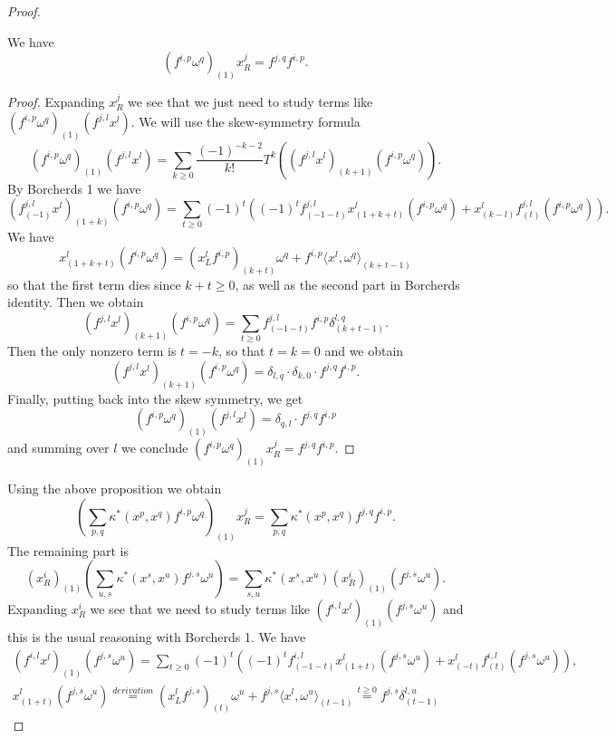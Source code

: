 \documentclass[a4paper, 10pt]{article}
\begin{document}
\begin{proof}
                \begin{prop}
                    We have \[(f^{i,p}\omega^q)_{(1)}x^j_R = f^{j,q}f^{i,p}. \]
                \end{prop}
                \begin{proof}
                    Expanding $x^j_R$ we see that we just need to study terms like $(f^{i,p}\omega^q)_{(1)}(f^{j,l}x^l)$.  We will use the skew-symmetry formula \[(f^{i,p}\omega^q)_{(1)}(f^{j, l}x^l) = \sum_{k \geq 0} \frac{(-1)^{-k-2}}{k!}T^k\left((f^{j,l}x^l)_{(k+1)}(f^{i,p}\omega^q)\right). \]
                    By Borcherds 1 we have \[(f^{j,l}_{(-1)}x^l)_{(1+k)}(f^{i,p}\omega^q) = \sum_{t \geq 0} (-1)^t\left((-1)^tf^{j,l}_{(-1-t)}x^l_{(1+k+t)}(f^{i,p}\omega^q) + x^l_{(k-l)}f^{j,l}_{(t)}(f^{i,p}\omega^q) \right). \] We have \[x^l_{(1+k+t)}(f^{i,p}\omega^q) = (x^l_Lf^{i,p})_{(k+t)}\omega^q + f^{i,p}\langle x^l, \omega^q \rangle_{(k+t-1)} \] so that the first term dies since $k+t \geq 0$, as well as the second part in Borcherds identity. Then we obtain \[(f^{j, l}x^l)_{(k+1)}(f^{i,p}\omega^q) = \sum_{t \geq 0} f^{j, l}_{(-1-t)}f^{i,p}\delta^{l,q}_{(k+t-1)}. \] Then the only nonzero term is $t = -k$, so that $t = k = 0$ and we obtain \[(f^{j, l}x^l)_{(k+1)}(f^{i,p}\omega^q) = \delta_{l, q}\cdot \delta_{k, 0} \cdot f^{j,q}f^{i,p}. \] Finally, putting back into the skew symmetry, we get \[(f^{i,p}\omega^q)_{(1)}(f^{j,l}x^l) = \delta_{q, l} \cdot f^{j,q}f^{i,p} \] and summing over $l$ we conclude $(f^{i,p}\omega^q)_{(1)}x^j_R = f^{j,q}f^{i,p}$.
                \end{proof}
                Using the above proposition we obtain \[\left(\sum_{p,q} \kappa^*(x^p,x^q)f^{i,p}\omega^q\right)_{(1)}x^j_R = \sum_{p,q}\kappa^*(x^p, x^q)f^{j,q}f^{i,p}. \]
                The remaining part is \[(x^i_R)_{(1)}\left(\sum_{u, s} \kappa^*(x^s, x^u)f^{j,s}\omega^u \right) = \sum_{s,u} \kappa^*(x^s, x^u)(x^i_R)_{(1)}(f^{j,s}\omega^u). \] Expanding $x^i_R$ we see that we need to study terms like $(f^{i, l}x^l)_{(1)}(f^{j,s}\omega^u)$ and this is the usual reasoning with Borcherds 1. We have 
                \begin{gather*}
                    (f^{i,l}x^l)_{(1)}(f^{j,s}\omega^u) = \sum_{t \geq 0}(-1)^t\left((-1)^tf^{i,l}_{(-1-t)}x^l_{(1+t)}(f^{j,s}\omega^u) + x^l_{(-t)}f^{i,l}_{(t)}(f^{j,s}\omega^u) \right), \\
                    x^l_{(1+t)}(f^{j,s}\omega^u) \stackrel{derivation}{=} (x^l_Lf^ {j,s})_{(t)}\omega^u + f^{j,s}\langle x^l, \omega^u \rangle_{(t-1)} \stackrel{t \geq 0}{=} f^{j,s}\delta^{l, u}_{(t-1)}

\end{gather*}
\end{proof}
\end{document}
